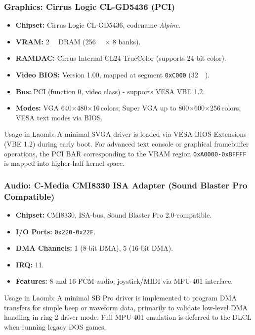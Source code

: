 \documentclass[12pt,a4paper]{report}
\begin{document}
	\subsubsection{Graphics: Cirrus Logic CL-GD5436 (PCI)}
	\begin{itemize}
		\item \textbf{Chipset:} Cirrus Logic CL-GD5436, codename \emph{Alpine}.
		\item \textbf{VRAM:} \SI{2}{\mebi\byte} DRAM (\SI{256}{\kibi\byte} × 8 banks).
		\item \textbf{RAMDAC:} Cirrus Internal CL24 TrueColor (supports 24-bit color).
		\item \textbf{Video BIOS:} Version 1.00, mapped at segment \texttt{0xC000} (\SI{32}{\kibi\byte}).
		\item \textbf{Bus:} PCI (function 0, video class) - supports VESA VBE 1.2.
		\item \textbf{Modes:} VGA \num{640}×\num{480}×\num{16}\,colors; Super VGA up to \num{800}×\num{600}×\num{256}\,colors; VESA text modes via BIOS.
	\end{itemize}
	
	Usage in Laomb: A minimal SVGA driver is loaded via VESA BIOS Extensions (VBE 1.2) during early boot. For advanced text console or graphical framebuffer operations, the PCI BAR corresponding to the VRAM region \texttt{0xA0000-0xBFFFF} is mapped into higher-half kernel space.
	
	\subsubsection{Audio: C-Media CMI8330 ISA Adapter (Sound Blaster Pro Compatible)}
	\begin{itemize}
		\item \textbf{Chipset:} CMI8330, ISA-bus, Sound Blaster Pro 2.0-compatible.
		\item \textbf{I/O Ports:} \texttt{0x220-0x22F}.
		\item \textbf{DMA Channels:} 1 (8-bit DMA), 5 (16-bit DMA).
		\item \textbf{IRQ:} 11.
		\item \textbf{Features:} \SI{8}{\bit} and \SI{16}{\bit} PCM audio; joystick/MIDI via MPU-401 interface.
	\end{itemize}
	
	Usage in Laomb: A minimal SB Pro driver is implemented to program DMA transfers for simple beep or waveform data, primarily to validate low-level DMA handling in ring-2 driver mode. Full MPU-401 emulation is deferred to the DLCL when running legacy DOS games.
	
\end{document}
